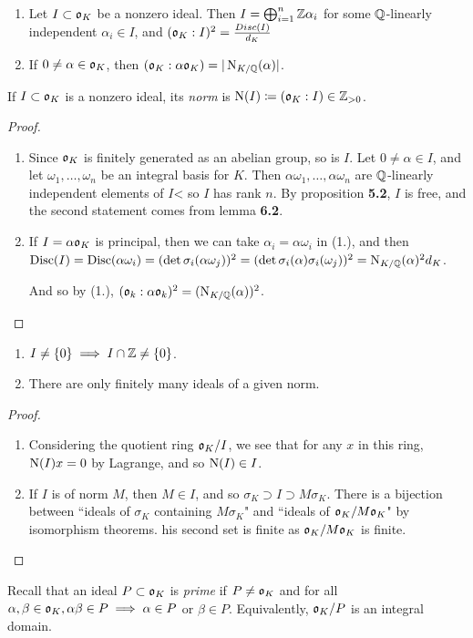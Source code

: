 \documentclass[10pt,a4paper]{article}
\begin{document}
\begin{proposition}
\item
\begin{enumerate}
\item Let $I \subset \mathfrak{o}_K$ be a nonzero ideal. Then $I = \bigoplus_{i=1}^n \mathbb{Z}\alpha_i$ for some $\mathbb{Q}$-linearly independent $\alpha_i \in I$, and $(\mathfrak{o}_K:I)^2 = \frac{Disc(I)}{d_K}$
\item If $0 \neq \alpha \in \mathfrak{o}_K$, then $(\mathfrak{o}_K:\alpha\mathfrak{o}_K) = |\operatorname{N}_{K/\mathbb{Q}}(\alpha)|$.
\end{enumerate}
\end{proposition}
If $I \subset \mathfrak{o}_K$ is a nonzero ideal, its \emph{norm} is $\operatorname{N}(I) \coloneqq (\mathfrak{o}_K:I) \in \mathbb{Z}_{>0}$.
\begin{proof}
\item
\begin{enumerate}
\item Since $\mathfrak{o}_K$ is finitely generated as an abelian group, so is $I$. Let $0 \neq \alpha \in I$, and let $\omega_1, \ldots, \omega_n$ be an integral basis for $K$. Then $\alpha\omega_1, \ldots, \alpha\omega_n$ are $\mathbb{Q}$-linearly independent elements of $I$< so $I$ has rank $n$. By proposition \textbf{5.2}, $I$ is free, and the second statement comes from lemma \textbf{6.2}.
\item If $I = \alpha \mathfrak{o}_K$ is principal, then we can take $\alpha_i = \alpha \omega_i$ in (1.), and then $\operatorname{Disc}(I) = \operatorname{Disc}(\alpha\omega_i) = (\det \sigma_i(\alpha\omega_j))^2 = (\det \sigma_i(\alpha)\sigma_i(\omega_j))^2 = \operatorname{N}_{K/\mathbb{Q}}(\alpha)^2 d_K$.

And so by (1.), $(\mathfrak{o}_k:\alpha\mathfrak{o}_k)^2 = (\operatorname{N}_{K/\mathbb{Q}}(\alpha))^2$.
\end{enumerate}
\end{proof}
\begin{corollary}
\item
\begin{enumerate}
\item $I \neq \{0\} \implies I \cap \mathbb{Z} \neq \{0\}$.
\item There are only finitely many ideals of a given norm.
\end{enumerate}
\end{corollary}
\begin{proof}
\item
\begin{enumerate}
\item Considering the quotient ring $\mathfrak{o}_K/I$, we see that for any $x$ in this ring, $\operatorname{N}(I)x = 0$ by Lagrange, and so $\operatorname{N}(I) \in I$.
\item If $I$ is of norm $M$, then $M \in I$, and so $\sigma_K \supset I \supset M\sigma_K$. There is a bijection between ``ideals of $\sigma_K$ containing $M\sigma_K$" and ``ideals of $\mathfrak{o}_K/M\mathfrak{o}_K$" by isomorphism theorems. his second set is finite as $\mathfrak{o}_K/M\mathfrak{o}_K$ is finite.
\end{enumerate}
\end{proof}
Recall that an ideal $P\subset \mathfrak{o}_K$ is \emph{prime} if $P \neq \mathfrak{o}_K$ and for all $\alpha, \beta \in \mathfrak{o}_K, \alpha\beta \in P \implies \alpha \in P$ or $\beta \in P$. Equivalently, $\mathfrak{o}_K/P$ is an integral domain.
\end{document}
